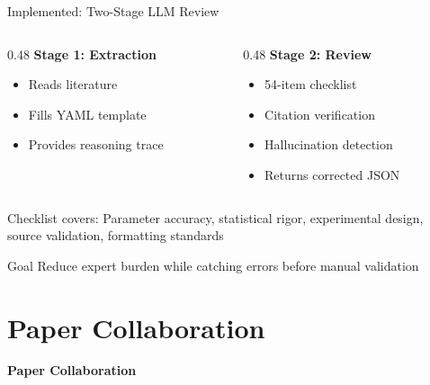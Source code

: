 \documentclass[10pt]{beamer}
\begin{document}
\begin{frame}{Implemented: Two-Stage LLM Review}

  \begin{columns}[T]
    \begin{column}{0.48\textwidth}
      \textbf{Stage 1: Extraction}
      \begin{itemize}
        \item Reads literature
        \item Fills YAML template
        \item Provides reasoning trace
      \end{itemize}
    \end{column}

    \begin{column}{0.48\textwidth}
      \textbf{Stage 2: Review}
      \begin{itemize}
        \item 54-item checklist
        \item Citation verification
        \item Hallucination detection
        \item Returns corrected JSON
      \end{itemize}
    \end{column}
  \end{columns}

  \vspace{0.2cm}

  \begin{block}{Checklist covers:}
    Parameter accuracy, statistical rigor, experimental design, source validation, formatting standards
  \end{block}

  \vspace{0.2cm}

  \begin{alertblock}{Goal}
    Reduce expert burden while catching errors before manual validation
  \end{alertblock}

\end{frame}

\section{Paper Collaboration}

\begin{frame}[plain,c]
  \begin{center}
    \Huge\textbf{Paper Collaboration}
  \end{center}
\end{frame}
\end{document}
